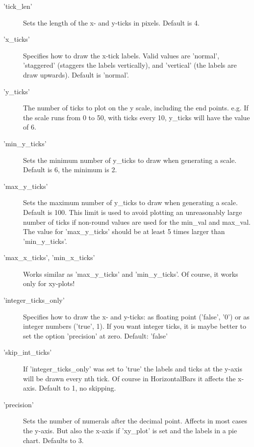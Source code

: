 \begin{description}
\item['tick\_len']Sets the length of the x- and y-ticks in pixels.  Default is 4.

\item['x\_ticks']Specifies how to draw the x-tick labels.  
        Valid values are 'normal', 'staggered' (staggers the labels vertically), 
        and 'vertical' (the labels are draw upwards).  Default is 'normal'.

\item['y\_ticks']The number of ticks to plot on the y scale, 
      including the end points. e.g. If the scale runs from 0 to 50,
			with ticks every 10, y\_ticks will have the value of 6.

\item['min\_y\_ticks']Sets the minimum number of y\_ticks to draw when generating a scale. 
        Default is 6, the minimum is 2.
        
\item['max\_y\_ticks']Sets the maximum number of y\_ticks to draw when generating a scale. 
       Default is 100. This limit is used to avoid plotting an unreasonably 
       large number of ticks if non-round values are used for the min\_val and
       max\_val.\\[\itemabstand]
       The value for 'max\_y\_ticks' should be at least 5 times larger than 'min\_y\_ticks'.
       
\item['max\_x\_ticks', 'min\_x\_ticks'] Works similar as 'max\_y\_ticks' and 'min\_y\_ticks'. 
      Of course, it works only for xy-plots! 

\item['integer\_ticks\_only']Specifies how to draw the x- and y-ticks: 
      as floating point ('false', '0') 
      or as integer numbers ('true', 1). 
      If you want integer ticks, it is maybe better to set the option 'precision' at zero. 
      Default: 'false'

\item['skip\_int\_ticks']If 'integer\_ticks\_only' was set to 'true' the labels and 
          ticks at the y-axis will be drawn every nth tick. 
          Of course in HorizontalBars it affects the x-axis. Default to 1, no skipping.

\item['precision'] Sets the number of numerals after the decimal point. 
             Affects in most cases the y-axis. 
             But also the x-axis if 'xy\_plot' is set and the labels in a pie chart. Defaults to 3.


\end{description}
